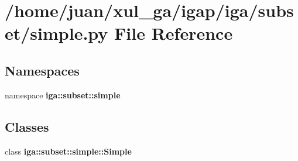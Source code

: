 \section{/home/juan/xul\_\-ga/igap/iga/subset/simple.py File Reference}
\label{subset_2simple_8py}
\subsection*{Namespaces}
\begin{CompactItemize}
\item 
namespace {\bf iga::subset::simple}
\end{CompactItemize}
\subsection*{Classes}
\begin{CompactItemize}
\item 
class {\bf iga::subset::simple::Simple}
\end{CompactItemize}
